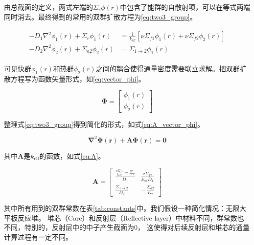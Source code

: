 由总截面的定义，两式左端的$\Sigma_r\phi(r)$中包含了能群的自散射项，可以在等式两端同时消去。最终得到的常用的双群扩散方程为\ref{eq:two3_group}。

\begin{align}
    \label{eq:two3_group}
    \begin{split}
        -D_1\nabla^2\phi_1(r) + \Sigma_r\phi_1(r) &= \frac{1}{k_\mathrm{eff}}\left[\nu\Sigma_{f1}\phi_1(r)+\nu\Sigma_{f2}\phi_2(r)\right] \\
        -D_2\nabla^2\phi_2(r) + \Sigma_{a2}\phi_2(r) &= \Sigma_{1\rightarrow 2}\phi_1(r)
    \end{split}
\end{align}

可见快群$\phi_1(r)$和热群$\phi_2(r)$之间的耦合使得通量密度需要联立求解。把双群扩散方程写为函数矢量形式，如\ref{eq:vector_phi}。

\begin{equation}
    \label{eq:vector_phi}
    \pmb{\Phi} = \begin{bmatrix}
        \phi_1(r) \\
        \phi_2(r)
    \end{bmatrix}
\end{equation}

整理式\ref{eq:two3_group}得到简化的形式，如式\ref{eq:A_vector_phi}。

\begin{equation}
    \label{eq:A_vector_phi}
    \pmb{\nabla}^2\pmb{\Phi}(\pmb{r})+\pmb{A}\pmb{\Phi}(\pmb{r}) = \pmb{0}
\end{equation}

其中$\pmb{A}$是$k_\mathrm{eff}$的函数，如式\ref{eq:A}。

\begin{equation}
    \label{eq:A}
    \pmb{A} = \begin{bmatrix}
        \frac{\frac{\nu\Sigma_{f1}}{k_\mathrm{eff}}-\Sigma_r}{D_1} & \frac{\nu\Sigma_{f2}}{k_\mathrm{eff}D_1} \\
        \frac{\Sigma_{1\rightarrow2}}{D_2} & -\frac{\Sigma_{a2}}{D_2}
    \end{bmatrix}
\end{equation}

其中所有用到的双群常数在表\ref{tab:constants}中。我们假设一种简化情况：无限大平板反应堆。
堆芯（Core）和反射层（Reflective layer）中材料不同，群常数也不同，特别的，反射层中的中子产生截面为$0$，
这使得对后续反射层和堆芯的通量计算过程有一定不同。

